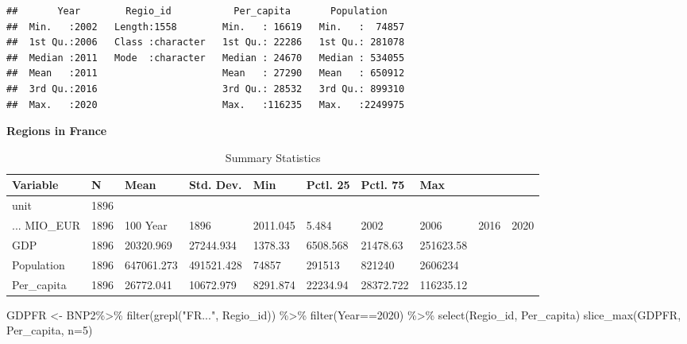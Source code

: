 \documentclass[
]{article}
\newenvironment{Shaded}{\begin{snugshade}}{\end{snugshade}}
\newcommand{\AttributeTok}[1]{\textcolor[rgb]{0.77,0.63,0.00}{#1}}
\newcommand{\DecValTok}[1]{\textcolor[rgb]{0.00,0.00,0.81}{#1}}
\newcommand{\FunctionTok}[1]{\textcolor[rgb]{0.00,0.00,0.00}{#1}}
\newcommand{\NormalTok}[1]{#1}
\newcommand{\OtherTok}[1]{\textcolor[rgb]{0.56,0.35,0.01}{#1}}
\newcommand{\SpecialCharTok}[1]{\textcolor[rgb]{0.00,0.00,0.00}{#1}}
\newcommand{\StringTok}[1]{\textcolor[rgb]{0.31,0.60,0.02}{#1}}
\begin{document}
\begin{verbatim}
##       Year        Regio_id           Per_capita       Population     
##  Min.   :2002   Length:1558        Min.   : 16619   Min.   :  74857  
##  1st Qu.:2006   Class :character   1st Qu.: 22286   1st Qu.: 281078  
##  Median :2011   Mode  :character   Median : 24670   Median : 534055  
##  Mean   :2011                      Mean   : 27290   Mean   : 650912  
##  3rd Qu.:2016                      3rd Qu.: 28532   3rd Qu.: 899310  
##  Max.   :2020                      Max.   :116235   Max.   :2249975
\end{verbatim}

\textbf{Regions in France}

\begin{table}

\caption{\label{tab:unnamed-chunk-6}Summary Statistics}
\centering
\begin{tabular}[t]{llllllll}
\toprule
Variable & N & Mean & Std. Dev. & Min & Pctl. 25 & Pctl. 75 & Max\\
\midrule
unit & 1896 &  &  &  &  &  & \\
... MIO_EUR & 1896 & 100%
Year & 1896 & 2011.045 & 5.484 & 2002 & 2006 & 2016 & 2020\\
GDP & 1896 & 20320.969 & 27244.934 & 1378.33 & 6508.568 & 21478.63 & 251623.58\\
Population & 1896 & 647061.273 & 491521.428 & 74857 & 291513 & 821240 & 2606234\\
\addlinespace
Per_capita & 1896 & 26772.041 & 10672.979 & 8291.874 & 22234.94 & 28372.722 & 116235.12\\
\bottomrule
\end{tabular}
\end{table}

\begin{Shaded}
\begin{Highlighting}[]
\NormalTok{GDPFR }\OtherTok{\textless{}{-}}\NormalTok{ BNP2}\SpecialCharTok{\%\textgreater{}\%}
  \FunctionTok{filter}\NormalTok{(}\FunctionTok{grepl}\NormalTok{(}\StringTok{"FR..."}\NormalTok{, Regio\_id)) }\SpecialCharTok{\%\textgreater{}\%}
  \FunctionTok{filter}\NormalTok{(Year}\SpecialCharTok{==}\DecValTok{2020}\NormalTok{) }\SpecialCharTok{\%\textgreater{}\%}
  \FunctionTok{select}\NormalTok{(Regio\_id, Per\_capita)}
\FunctionTok{slice\_max}\NormalTok{(GDPFR, Per\_capita, }\AttributeTok{n=}\DecValTok{5}\NormalTok{)}
\end{Highlighting}
\end{Shaded}
\end{document}

